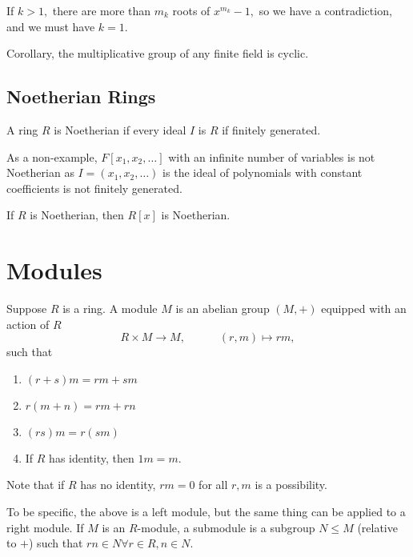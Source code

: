 \documentclass{article}
\numberwithin{equation}{section}
\begin{document}
If $k>1,$ there are more than $m_k$ roots of $x^{m_k}-1,$ so we have a contradiction, and we must have $k=1.$

Corollary, the multiplicative group of any finite field is cyclic.
\subsection{Noetherian Rings}
\begin{definition}
    A ring $R$ is Noetherian if every ideal $I$ is $R$ if finitely generated.
\end{definition}
As a non-example, $F[x_1,x_2,\dots]$ with an infinite number of variables is not Noetherian as $I=(x_1,x_2,\dots)$ is the ideal of polynomials with constant coefficients is not finitely generated.
\begin{theorem}
     If $R$ is Noetherian, then $R[x]$ is Noetherian.
\end{theorem}


\section{Modules}
\begin{definition}
    Suppose $R$ is a ring. A module $M$ is an abelian group $(M,+)$ equipped with an action of $R$ 
    \begin{equation}
        R\times M\to M,\quad\quad\quad (r,m) \mapsto rm,
    \end{equation}
    such that 
    \begin{enumerate}[label=(\roman*)]
        \item $(r+s)m=rm+sm$
        \item $r(m+n)=rm+rn$
        \item $(rs)m=r(sm)$
        \item If $R$ has identity, then $1m=m.$
    \end{enumerate}
    Note that if $R$ has no identity, $rm=0$ for all $r,m$ is a possibility.
\end{definition}
To be specific, the above is a left module, but the same thing can be applied to a right module. If $M$ is an $R$-module, a submodule is a subgroup $N \le M$ (relative to $+$) such that $rn \in N \forall r\in R,n\in N.$
\end{document}
